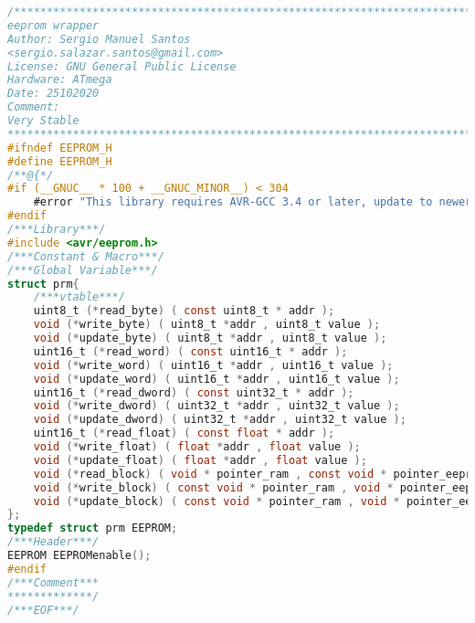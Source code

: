 \begin{lstlisting}[language=C, caption={eeprom.h}, label=eeprom-h, captionpos=b]
/*************************************************************************
eeprom wrapper
Author: Sergio Manuel Santos
<sergio.salazar.santos@gmail.com>
License: GNU General Public License
Hardware: ATmega
Date: 25102020
Comment:
Very Stable
*************************************************************************/
#ifndef EEPROM_H
#define EEPROM_H
/**@{*/
#if (__GNUC__ * 100 + __GNUC_MINOR__) < 304
	#error "This library requires AVR-GCC 3.4 or later, update to newer AVR-GCC compiler !"
#endif
/***Library***/
#include <avr/eeprom.h>
/***Constant & Macro***/
/***Global Variable***/
struct prm{
	/***vtable***/
	uint8_t (*read_byte) ( const uint8_t * addr );
	void (*write_byte) ( uint8_t *addr , uint8_t value );
	void (*update_byte) ( uint8_t *addr , uint8_t value );
	uint16_t (*read_word) ( const uint16_t * addr );
	void (*write_word) ( uint16_t *addr , uint16_t value );
	void (*update_word) ( uint16_t *addr , uint16_t value );
	uint16_t (*read_dword) ( const uint32_t * addr );
	void (*write_dword) ( uint32_t *addr , uint32_t value );
	void (*update_dword) ( uint32_t *addr , uint32_t value );
	uint16_t (*read_float) ( const float * addr );
	void (*write_float) ( float *addr , float value );
	void (*update_float) ( float *addr , float value );
	void (*read_block) ( void * pointer_ram , const void * pointer_eeprom , size_t n);
	void (*write_block) ( const void * pointer_ram , void * pointer_eeprom , size_t n);
	void (*update_block) ( const void * pointer_ram , void * pointer_eeprom , size_t n);
};
typedef struct prm EEPROM;
/***Header***/
EEPROM EEPROMenable();
#endif
/***Comment***
*************/
/***EOF***/
\end{lstlisting}
